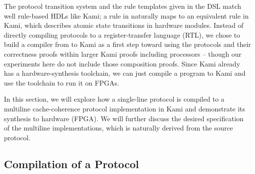 \documentclass[sigplan,10pt,review,anonymous,screen]{acmart}\settopmatter{printfolios=true,printccs=false,printacmref=false}
\begin{document}
The protocol transition system and the rule templates given in the \hemiola{} DSL match well rule-based HDLs like Kami; a rule in \hemiola{} naturally maps to an equivalent rule in Kami, which describes atomic state transitions in hardware modules.
Instead of directly compiling \hemiola{} protocols to a register-transfer language (RTL), we chose to build a compiler from \hemiola{} to Kami as a first step toward using the protocols and their correctness proofs within larger Kami proofs including processors -- though our experiments here do not include those composition proofs.
Since Kami already has a hardware-synthesis toolchain, we can just compile a \hemiola{} program to Kami and use the toolchain to run it on FPGAs.

In this section, we will explore how a single-line \hemiola{} protocol is compiled to a multiline cache-coherence protocol implementation in Kami and demonstrate its synthesis to hardware (FPGA).
We will further discuss the desired specification of the multiline implementations, which is naturally derived from the source \hemiola{} protocol.

\subsection{Compilation of a \hemiola{} Protocol}
\label{sec-compiler}
\end{document}
